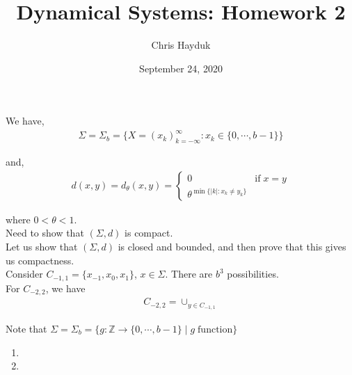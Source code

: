 \documentclass[12pt]{article}
\newenvironment{problem}[2][Problem]{\begin{trivlist}
\item[\hskip \labelsep {\bfseries #1}\hskip \labelsep {\bfseries #2.}]}{\end{trivlist}}
\begin{document}
\title{Dynamical Systems: Homework 2}

\author{Chris Hayduk}
\date{September 24, 2020}

\maketitle

\begin{problem}{1}
\end{problem}

We have,
\begin{align*}
\Sigma = \Sigma_b = \{X = (x_k)_{k = -\infty}^{\infty}: x_k \in \{0, \cdots, b - 1\}\}
\end{align*}

and,
\begin{align*}
d(x,y) = d_{\theta}(x,y) = \begin{cases*}
      0 & \text{if} \; x = y \\
      \theta^{\min\{|k|: x_k \neq y_k\}} &
    \end{cases*}
\end{align*}

where $0 < \theta < 1$.\\

Need to show that $(\Sigma, d)$ is compact.\\

Let us show that $(\Sigma, d)$ is closed and bounded, and then prove that this gives us compactness.\\

Consider $C_{-1, 1} = \{x_{-1}, x_0, x_1\}$, $x \in \Sigma$. There are $b^3$ possibilities.\\

For $C_{-2, 2}$, we have
\begin{align*}
C_{-2, 2} = \cup_{y \in C_{-1, 1}} 
\end{align*}

Note that $\Sigma = \Sigma_b = \{g: \mathbb{Z} \to \{0, \cdots, b-1\} 
\; | \; g \; \text{function}\}$

\begin{problem}{2}
\end{problem}

\begin{problem}{3}
\end{problem}

\begin{enumerate}[label=(\alph*)]
\item

\item
\end{enumerate}

\begin{problem}{4}
\end{problem}
\end{document}
